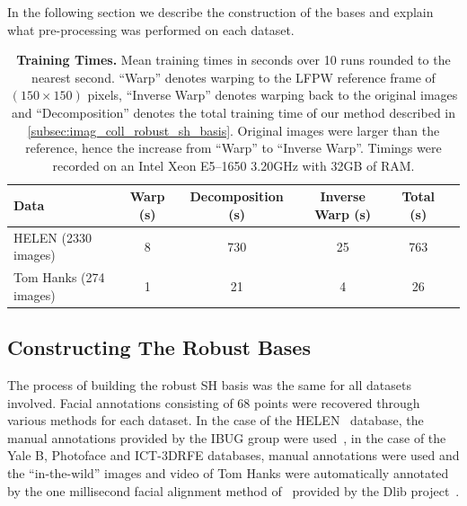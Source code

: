 In the following section we describe the construction of the bases and explain
what pre-processing was performed on each dataset.
\begin{table}
    \centering
    \begin{tabular}{lccccc}
        \toprule
        \textbf{Data}          & \textbf{Warp (s)} & \textbf{Decomposition (s)} & \textbf{Inverse Warp (s)} & \textbf{Total (s)} \\ \midrule
        HELEN (2330 images)    & 8                 & 730                        & 25                        & 763                \\
        Tom Hanks (274 images) & 1                 & 21                         & 4                         & 26                 \\  \bottomrule
    \end{tabular}
    \caption{\textbf{Training Times.} Mean training times in seconds over 10
             runs rounded to the nearest second. ``Warp'' denotes warping to the
             LFPW reference frame of $(150 \times 150)$ pixels, ``Inverse Warp''
             denotes warping back to the original images and ``Decomposition''
             denotes the total training time of our method described in
             \cref{subsec:imag_coll_robust_sh_basis}. Original images were larger than
             the reference, hence the increase from ``Warp'' to ``Inverse Warp''.
             Timings were recorded on an Intel Xeon E5--1650 3.20GHz with
             32GB of RAM.}
\label{tbl:imag_coll_timings}
\end{table}
\subsection{Constructing The Robust Bases}\label{subsec:imag_coll_construction}
The process of building the robust SH basis was the same for all datasets
involved. Facial annotations consisting of 68 points were recovered through
various methods for each dataset. In the case of the
HELEN~\cite{le2012interactive} database, the manual
annotations provided by the IBUG group were used~\cite{sagonas2013300,sagonas2013semi},
in the case of the Yale B, Photoface and ICT-3DRFE databases, manual annotations
were used and the ``in-the-wild'' images and video of Tom Hanks were automatically
annotated by the one millisecond facial alignment method of~\cite{kazemi2014one}
provided by the Dlib project~\cite{king2009dlib}.

